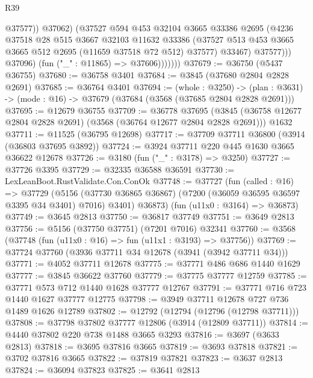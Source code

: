 \begin{lexlean}{R39}
\begin{coremodule}
                            @37577))
                        @37062)
                      (@37527
                        @594
                        @453
                        @32104
                        @3665
                        @33386
                        @2695
                        (@4236
                          @37518
                          @28
                          @515
                          @3667
                          @32103
                          @11632
                          @33386
                          (@37527 @513 @453 @3665 @3665 @512 @2695 (@11659 @37518 @72 @512) @37577)
                          @33467)
                        @37577)))
                  @37096)
                (fun ("_" : @11865) => @37606)))))))
@37679 := @36750 (@5437 @36755)
@37680 := @36758 @3401
@37684 := @3845 (@37680 @2804 @2828 @2691)
@37685 := @36764 @3401
@37694 := (whole : @3250) ->
  (plan : @3631) -> (mode : @16) -> @37679 (@37684 (@3568 (@37685 @2804 @2828 @2691)))
@37695 := @12679 @36755
@37709 := @36778
    @37695
    (@3845 (@36758 @12677 @2804 @2828 @2691) (@3568 (@36764 @12677 @2804 @2828 @2691)))
    @1632
@37711 := @11525 (@36795 @12698)
@37717 := @37709 @37711 @36800 (@3914 (@36803 @37695 @3892))
@37724 := @3924 @37711 @220 @445 @1630 @3665 @36622 @12678
@37726 := @3180 (fun ("_" : @3178) => @3250)
@37727 := @37726 @3395
@37729 := @32335 @36588 @36591
@37730 := LexLeanBoot.RustValidate.Con.ConOk
@37748 := @37727
    (fun (called : @16) =>
    @37729
      (@5156 (@37730 @36865 @36867) (@7200 (@36059 @36595 @36597 @3395 @34 @3401) @7016) @3401)
      @36873)
    (fun (u11x0 : @3164) => @36873)
@37749 := @3645 @2813
@37750 := @36817 @37749
@37751 := @3649 @2813
@37756 := @5156 (@37750 @37751) (@7201 @7016) @32341
@37760 := @3568 (@37748 (fun (u11x0 : @16) => fun (u11x1 : @3193) => @37756))
@37769 := @37724 @37760 (@3936 @37711 @34 @12678 (@3941 (@3942 @37711 @34)))
@37771 := @4052 @37711 @12678
@37775 := @37771 @486 @686 @1440 @1629
@37777 := @3845 @36622 @37760
@37779 := @37775 @37777 @12759
@37785 := @37771 @573 @712 @1440 @1628 @37777 @12767
@37791 := @37771 @716 @723 @1440 @1627 @37777 @12775
@37798 := @3949 @37711 @12678 @727 @736 @1489 @1626 @12789
@37802 := @12792 (@12794 (@12796 (@12798 @37711)))
@37808 := @37798 @37802 @37777 @12806 (@3914 (@12809 @37711))
@37814 := @4440 @37802 @220 @738 @1488 @3665 @3293
@37816 := @3697 (@3633 @2813)
@37818 := @3695 @37816 @3665
@37819 := @3693 @37818
@37821 := @3702 @37816 @3665
@37822 := @37819 @37821
@37823 := @3637 @2813
@37824 := @36094 @37823
@37825 := @3641 @2813

\end{coremodule}
\end{lexlean}
